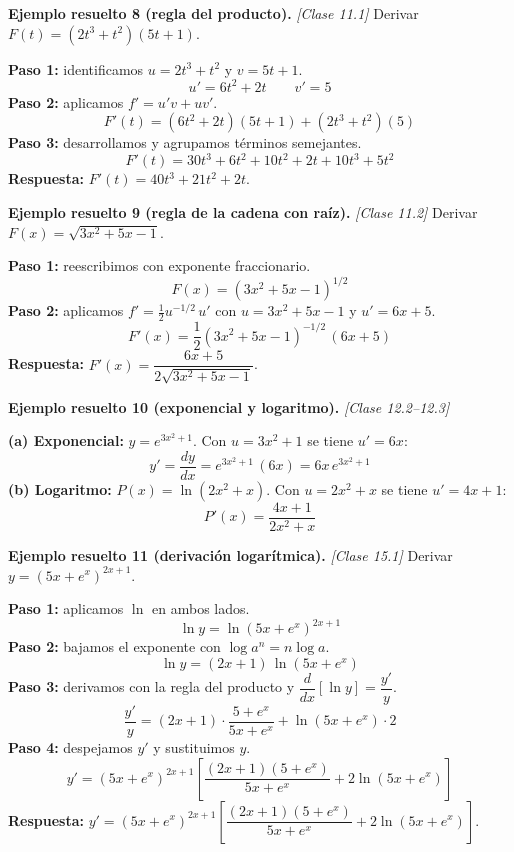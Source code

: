 \documentclass[12pt, letterpaper]{article}
\begin{document}
\noindent\textbf{Ejemplo resuelto 8 (regla del producto).} \emph{[Clase 11.1]}
Derivar $F(t) = (2t^{3}+t^{2})(5t+1)$.

\begin{cuadrosolucion}
  \textbf{Paso 1:} identificamos $u = 2t^{3}+t^{2}$ y $v = 5t+1$.
  \[
    u' = 6t^{2}+2t
    \qquad
    v' = 5
  \]
  \textbf{Paso 2:} aplicamos $f' = u'v + uv'$.
  \[
    F'(t) = (6t^{2}+2t)(5t+1) + (2t^{3}+t^{2})(5)
  \]
  \textbf{Paso 3:} desarrollamos y agrupamos términos semejantes.
  \[
    F'(t) = 30t^{3} + 6t^{2} + 10t^{2} + 2t + 10t^{3} + 5t^{2}
  \]
  \textbf{Respuesta:} $F'(t) = 40t^{3} + 21t^{2} + 2t$.
\end{cuadrosolucion}

\noindent\textbf{Ejemplo resuelto 9 (regla de la cadena con raíz).} \emph{[Clase 11.2]}
Derivar $F(x) = \sqrt{3x^{2}+5x-1}$.

\begin{cuadrosolucion}
  \textbf{Paso 1:} reescribimos con exponente fraccionario.
  \[
    F(x) = (3x^{2}+5x-1)^{1/2}
  \]
  \textbf{Paso 2:} aplicamos $f' = \tfrac{1}{2}u^{-1/2}\,u'$ con $u = 3x^{2}+5x-1$ y $u' = 6x+5$.
  \[
    F'(x) = \frac{1}{2}(3x^{2}+5x-1)^{-1/2}\,(6x+5)
  \]
  \textbf{Respuesta:} $F'(x) = \dfrac{6x+5}{2\sqrt{3x^{2}+5x-1}}$.
\end{cuadrosolucion}

\noindent\textbf{Ejemplo resuelto 10 (exponencial y logaritmo).} \emph{[Clase 12.2–12.3]}

\begin{cuadrosolucion}
  \textbf{(a) Exponencial:} $y = e^{3x^{2}+1}$. Con $u = 3x^{2}+1$ se tiene $u' = 6x$:
  \[
    y' = \frac{dy}{dx} = e^{3x^{2}+1}\,(6x) = 6x\,e^{3x^{2}+1}
  \]
  \textbf{(b) Logaritmo:} $P(x) = \ln(2x^{2}+x)$. Con $u = 2x^{2}+x$ se tiene $u' = 4x+1$:
  \[
    P'(x) = \frac{4x+1}{2x^{2}+x}
  \]
\end{cuadrosolucion}

\noindent\textbf{Ejemplo resuelto 11 (derivación logarítmica).} \emph{[Clase 15.1]}
Derivar $y = (5x + e^{x})^{2x+1}$.

\begin{cuadrosolucion}
  \textbf{Paso 1:} aplicamos $\ln$ en ambos lados.
  \[
    \ln y = \ln (5x + e^{x})^{2x+1}
  \]
  \textbf{Paso 2:} bajamos el exponente con $\log a^{n} = n\log a$.
  \[
    \ln y = (2x+1)\,\ln(5x+e^{x})
  \]
  \textbf{Paso 3:} derivamos con la regla del producto y $\dfrac{d}{dx}[\ln y] = \dfrac{y'}{y}$.
  \[
    \frac{y'}{y} = (2x+1)\cdot\frac{5 + e^{x}}{5x + e^{x}} + \ln(5x+e^{x})\cdot 2
  \]
  \textbf{Paso 4:} despejamos $y'$ y sustituimos $y$.
  \[
    y' = (5x+e^{x})^{2x+1}\left[\frac{(2x+1)(5+e^{x})}{5x+e^{x}} + 2\ln(5x+e^{x})\right]
  \]
  \textbf{Respuesta:} $y' = (5x+e^{x})^{2x+1}\left[\dfrac{(2x+1)(5+e^{x})}{5x+e^{x}} + 2\ln(5x+e^{x})\right]$.
\end{cuadrosolucion}
\end{document}
